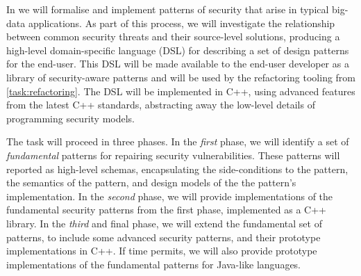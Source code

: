 \begin{Workpackage}{\thewpno}
\begin{Task}
	
	\TaskResults{%
	}
	\TaskHeader{}
	
In \theTask{} we will formalise and implement patterns of security that arise in typical big-data applications. As part of this process, we will investigate the relationship between common security threats and their source-level solutions, producing a high-level domain-specific language (DSL) for describing a set of design patterns for the end-user. This DSL will be made available to the end-user developer as a library of security-aware patterns and will be used by the refactoring tooling from \ref{task:refactoring}. The DSL will be implemented in C++, using advanced features from the latest C++ standards, abstracting away the low-level details of programming security models.

The task will proceed in three phases. In the \emph{first} phase, we will identify a set of \emph{fundamental} patterns for repairing security vulnerabilities. These patterns will reported as high-level schemas, encapsulating the side-conditions to the pattern, the semantics of the pattern, and design models of the the pattern's implementation.
In the \emph{second} phase, we will provide implementations of the fundamental security patterns from the first phase, implemented as a C++ library. In the \emph{third} and final phase, we will extend the fundamental set of patterns, to include some advanced security patterns, and their prototype implementations in C++. If time permits, we will also provide prototype implementations of the fundamental patterns for Java-like languages. 
\end{Task}

\begin{Task}
	
	\TaskResults{%
	}
	\TaskHeader{}
	

\end{Task}
\end{Workpackage}
